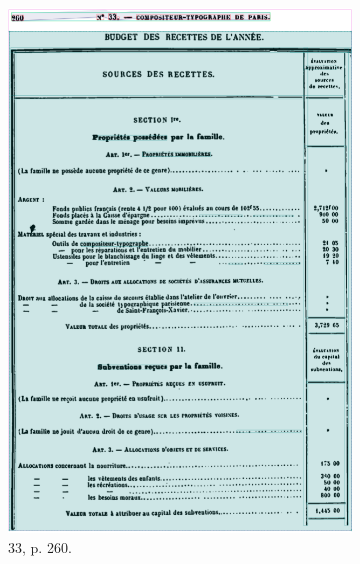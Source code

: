 \begin{figure}[t]
\begin{subfigure}{0.3\textwidth}
     \includegraphics[width=1\linewidth]{img/transkribus_33.png}
     \caption{\no{} 33, p. 260.}
     \label{fig:odm33tkb}
    \end{subfigure}
    \hspace{5pt}
    \begin{subfigure}{0.3\textwidth}

\end{subfigure}
\end{figure}
